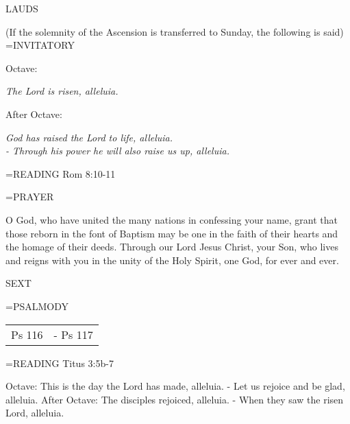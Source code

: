 \begin{flushleft}\normalsize LAUDS\\\end{flushleft}
(If the solemnity of the Ascension is transferred to Sunday, the following is said)
\hangindent=\parindent \small{INVITATORY}
\begin{center}
\end{center}Octave:\begin{center}\textit{	The Lord is risen, alleluia.\\}
\end{center}After Octave:\begin{center}\textit{	God has raised the Lord to life, alleluia.\\}
\textit{		- Through his power he will also raise us up, alleluia.\\}
\end{center}

\hangindent=\parindent \small{\uppercase{READING}}    Rom 8:10-11 \textbf{   \\}

\hangindent=\parindent \small PRAYER
\begin{description}[labelindent=\parindent, leftmargin=*]
\item [Octave:] 	O God, who have united the many nations in confessing your name, grant that those reborn in the font of Baptism may be one in the faith of their hearts and the homage of their deeds. Through our Lord Jesus Christ, your Son, who lives and reigns with you in the unity of the Holy Spirit, one God, for ever and ever.
\item [After Octave:] 	
\end{description}

\begin{flushleft}\normalsize SEXT\\\end{flushleft}
\hangindent=\parindent \small{PSALMODY}
\begin{center}
\begin{tabular}{ l l }
Ps 116 &  - Ps 117\\
\end{tabular}
\end{center}		

\hangindent=\parindent \small{\uppercase{READING}}    Titus 3:5b-7 \textbf{   \\}

Octave:	This is the day the Lord has made, alleluia.
		- Let us rejoice and be glad, alleluia.
After Octave:	The disciples rejoiced, alleluia.
		- When they saw the risen Lord, alleluia.


